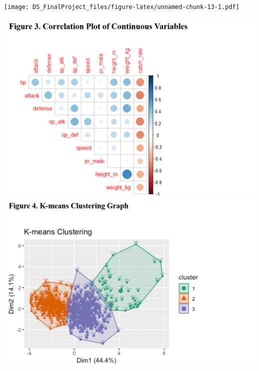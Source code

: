 \documentclass[
]{article}
\begin{document}
\texttt{[image: DS\_FinalProject\_files/figure-latex/unnamed-chunk-13-1.pdf]}

\includegraphics{anno_fig/fig3.png} \includegraphics{anno_fig/fig4.png}
\end{document}
